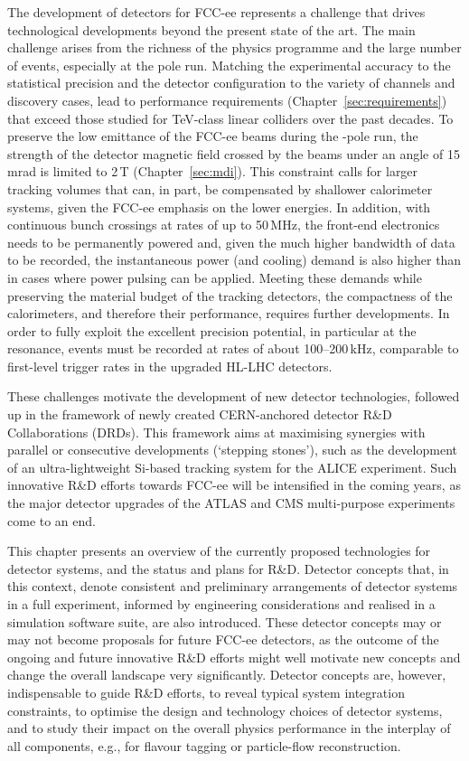 The development of detectors for FCC-ee represents a challenge that drives technological developments beyond the present state of the art. 
The main challenge arises from the richness of the physics programme and the large number of events, especially at the \PZ pole run. 
Matching the experimental accuracy to the statistical precision and the detector configuration to the variety of channels and discovery cases, 
lead to performance requirements (Chapter~\ref{sec:requirements}) that exceed those studied for TeV-class linear colliders over the past decades.
To preserve the low emittance of the FCC-ee beams during the \PZ-pole run, 
the strength of the detector magnetic field crossed by the beams under an angle of 15\,mrad is limited to 2\,T (Chapter~\ref{sec:mdi}). 
This constraint calls for larger tracking volumes that can, in part, be compensated by shallower calorimeter systems,
given the FCC-ee emphasis on the lower energies.
In addition, with continuous bunch crossings at rates of up to 50\,MHz, the front-end electronics needs to be permanently powered 
and, given the much higher bandwidth of data to be recorded, 
the instantaneous power (and cooling) demand is also higher than in cases where power pulsing can be applied.
Meeting these demands while preserving the material budget of the tracking detectors, 
the compactness of the calorimeters, and therefore their performance, requires further developments. 
In order to fully exploit the excellent precision potential, in particular at the \PZ resonance, 
events must be recorded at rates of about 100--200\,kHz, 
comparable to first-level trigger rates in the upgraded HL-LHC detectors. 

These challenges motivate the development of new detector technologies, 
followed up in the framework of newly created CERN-anchored detector R\&D Collaborations (DRDs). 
This framework aims at maximising synergies with parallel or consecutive developments (`stepping stones'), 
such as the development of an ultra-lightweight Si-based tracking system for the ALICE experiment. 
Such innovative R\&D efforts towards FCC-ee will be intensified in the coming years, 
as the major detector upgrades of the ATLAS and CMS multi-purpose experiments come to an end. 

This chapter presents an overview of the currently proposed technologies for detector systems, and the status and plans for R\&D. 
Detector concepts that, in this context, 
denote consistent and preliminary arrangements of detector systems in a full experiment, 
informed by engineering considerations and realised in a simulation software suite, are also introduced. 
These detector concepts may or may not become proposals for future FCC-ee detectors, 
as the outcome of the ongoing and future innovative R\&D efforts might well motivate new concepts 
and change the overall landscape very significantly. 
Detector concepts are, however, indispensable to guide R\&D efforts, 
to reveal typical system integration constraints, 
to optimise the design and technology choices of detector systems, 
and to study their impact on the overall physics performance in the interplay of all components, 
e.g., for flavour tagging or particle-flow reconstruction. 

